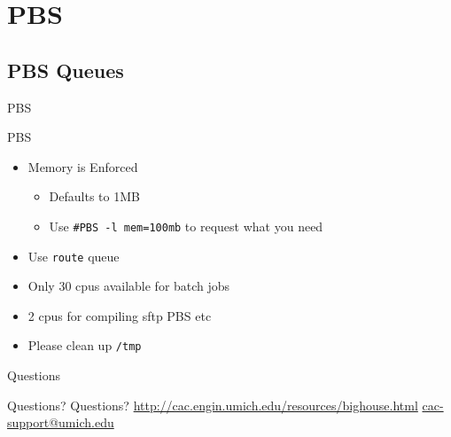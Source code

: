 \documentclass{beamer}
\begin{document}
\section{PBS}
\subsection{PBS Queues}
\begin{frame}{PBS}
\begin{block}{PBS}
 \begin{itemize}
  \item{Memory is Enforced}
  \begin{itemize}
   \item{Defaults to 1MB}
   \item{Use \texttt{\#PBS -l mem=100mb} to request what you need}
  \end{itemize}
  \item{Use \texttt{route} queue}
  \item{Only 30 cpus available for batch jobs}
  \item{2 cpus for compiling sftp PBS etc}
  \item{Please clean up \texttt{/tmp}}
 \end{itemize}
\end{block}
\end{frame}
\begin{frame}{Questions}
 \begin{block}{Questions?}
 Questions?
 \url{http://cac.engin.umich.edu/resources/bighouse.html}
 \url{cac-support@umich.edu}
 \end{block}
\end{frame}
\end{document}
